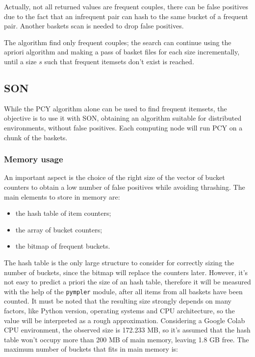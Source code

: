 \documentclass{article}
\begin{document}
Actually, not all returned values are frequent couples, there can be false positives due to the fact that an infrequent pair can hash to the same bucket of a frequent pair. Another baskets scan is needed to drop false positives.

The algorithm find only frequent couples; the search can continue using the apriori algorithm and making a pass of basket files for each size incrementally, until a size $s$ such that frequent itemsets don't exist is reached.

\subsection{SON}

While the PCY algorithm alone can be used to find frequent itemsets, the objective is to use it with SON, obtaining an algorithm suitable for distributed environments, without false positives. Each computing node will run PCY on a chunk of the baskets.

\subsubsection{Memory usage}

An important aspect is the choice of the right size of the vector of bucket counters to obtain a low number of false positives while avoiding thrashing.
The main elements to store in memory are:
\begin{itemize}
	\item the hash table of item counters;
	\item the array of bucket counters;
	\item the bitmap of frequent buckets.
\end{itemize}
The hash table is the only large structure to consider for correctly sizing the number of buckets, since the bitmap will replace the counters later.
However, it's not easy to predict a priori the size of an hash table, therefore it will be measured with the help of the \texttt{pympler} module, after all items from all baskets have been counted. It must be noted that the resulting size strongly depends on many factors, like Python version, operating systems and CPU architecture, so the value will be interpreted as a rough approximation. Considering a Google Colab CPU environment, the observed size is 172.233 MB, so it's assumed that the hash table won't occupy more than 200 MB of main memory, leaving 1.8 GB free. The maximum number of buckets that fits in main memory is:
\end{document}
